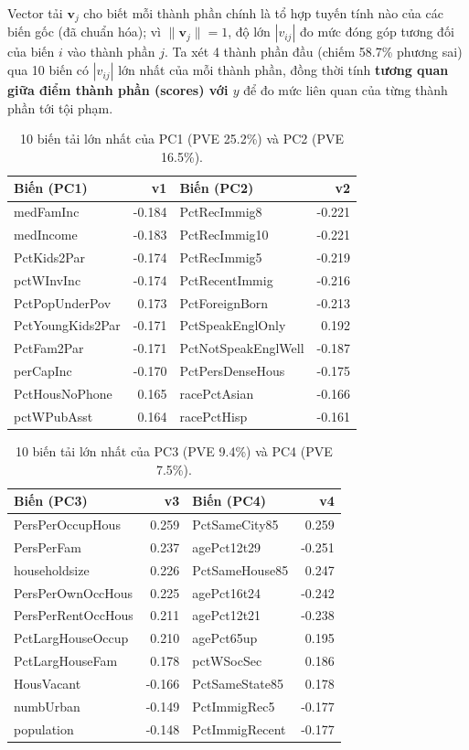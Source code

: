 Vector tải \(\mathbf{v}_j\) cho biết mỗi thành phần chính là tổ hợp
tuyến tính nào của các biến gốc (đã chuẩn hóa); vì
\(\lVert\mathbf{v}_j\rVert = 1\), độ lớn \(|v_{ij}|\) đo mức đóng góp
tương đối của biến \(i\) vào thành phần \(j\). Ta xét 4 thành phần đầu
(chiếm 58.7\% phương sai) qua 10 biến có \(|v_{ij}|\) lớn nhất của mỗi
thành phần, đồng thời tính \textbf{tương quan giữa điểm thành phần
(scores) với \(y\)} để đo mức liên quan của từng thành phần tới tội
phạm.

\begin{longtable}[t]{lrlr}
\caption{\label{tab:loadings-tables}10 biến tải lớn nhất của PC1 (PVE 25.2\%) và PC2 (PVE 16.5\%).}\\
\toprule
Biến (PC1) & v1 & Biến (PC2) & v2\\
\midrule
medFamInc & -0.184 & PctRecImmig8 & -0.221\\
medIncome & -0.183 & PctRecImmig10 & -0.221\\
PctKids2Par & -0.174 & PctRecImmig5 & -0.219\\
pctWInvInc & -0.174 & PctRecentImmig & -0.216\\
PctPopUnderPov & 0.173 & PctForeignBorn & -0.213\\
\addlinespace
PctYoungKids2Par & -0.171 & PctSpeakEnglOnly & 0.192\\
PctFam2Par & -0.171 & PctNotSpeakEnglWell & -0.187\\
perCapInc & -0.170 & PctPersDenseHous & -0.175\\
PctHousNoPhone & 0.165 & racePctAsian & -0.166\\
pctWPubAsst & 0.164 & racePctHisp & -0.161\\
\bottomrule
\end{longtable}

\begin{longtable}[t]{lrlr}
\caption{\label{tab:loadings-tables-pc34}10 biến tải lớn nhất của PC3 (PVE 9.4\%) và PC4 (PVE 7.5\%).}\\
\toprule
Biến (PC3) & v3 & Biến (PC4) & v4\\
\midrule
PersPerOccupHous & 0.259 & PctSameCity85 & 0.259\\
PersPerFam & 0.237 & agePct12t29 & -0.251\\
householdsize & 0.226 & PctSameHouse85 & 0.247\\
PersPerOwnOccHous & 0.225 & agePct16t24 & -0.242\\
PersPerRentOccHous & 0.211 & agePct12t21 & -0.238\\
\addlinespace
PctLargHouseOccup & 0.210 & agePct65up & 0.195\\
PctLargHouseFam & 0.178 & pctWSocSec & 0.186\\
HousVacant & -0.166 & PctSameState85 & 0.178\\
numbUrban & -0.149 & PctImmigRec5 & -0.177\\
population & -0.148 & PctImmigRecent & -0.177\\
\bottomrule
\end{longtable}

